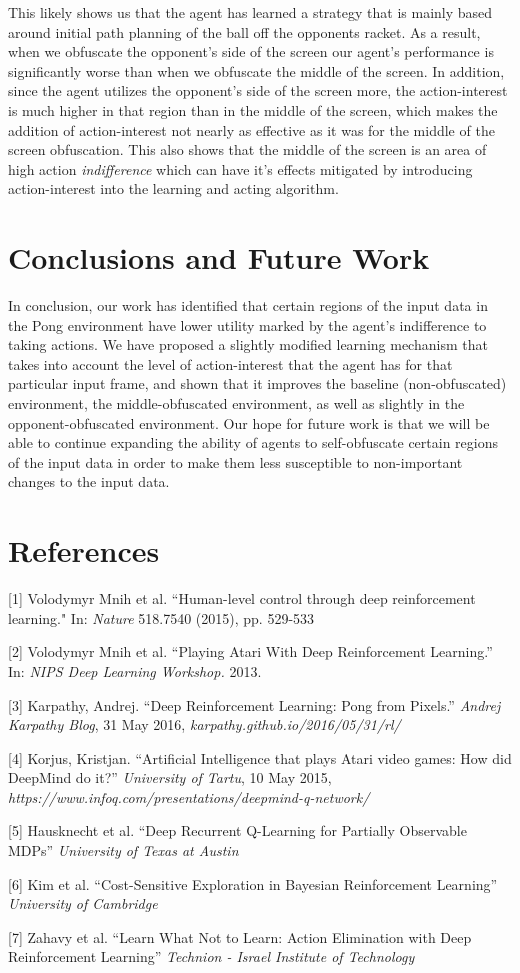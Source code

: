 \documentclass{article}
\begin{document}
This likely shows us that the agent has learned a strategy that is mainly based around initial path planning of the ball off the opponents racket.
As a result, when we obfuscate the opponent's side of the screen our agent's performance is significantly worse than when we obfuscate the middle of the
screen. In addition, since the agent utilizes the opponent's side of the screen more, the action-interest is much higher in that region than in the
middle of the screen, which makes the addition of action-interest not nearly as effective as it was for the middle of the screen obfuscation.
This also shows that the middle of the screen is an area of high action \textit{indifference} which can have it's effects mitigated by introducing
action-interest into the learning and acting algorithm. 


\section{Conclusions and Future Work}

In conclusion, our work has identified that certain regions of the input data in the Pong environment have lower utility marked by 
the agent's indifference to taking actions. We have proposed a slightly modified learning mechanism that takes into account the level of action-interest
that the agent has for that particular input frame, and shown that it improves the baseline (non-obfuscated) environment, the middle-obfuscated environment,
as well as slightly in the opponent-obfuscated environment. Our hope for future work is that we will be able to continue expanding the ability of agents to
self-obfuscate certain regions of the input data in order to make them less susceptible to non-important changes to the input data.

\section*{References}
\medskip
\small
[1] Volodymyr Mnih et al. ``Human-level control through deep reinforcement learning." In: {\it Nature}
518.7540 (2015), pp. 529-533 

[2] Volodymyr Mnih et al. ``Playing Atari With Deep Reinforcement Learning.'' In: {\it NIPS Deep Learning
Workshop.} 2013. 

[3] Karpathy, Andrej. ``Deep Reinforcement Learning: Pong from Pixels.'' {\it Andrej Karpathy Blog},
31 May 2016, {\it karpathy.github.io/2016/05/31/rl/}

[4] Korjus, Kristjan. ``Artificial Intelligence that plays Atari video games: How did DeepMind do it?'' {\it University of Tartu},
10 May 2015, {\it https://www.infoq.com/presentations/deepmind-q-network/}

[5] Hausknecht et al. ``Deep Recurrent Q-Learning for Partially Observable MDPs'' {\it University of Texas at Austin}

[6] Kim et al. ``Cost-Sensitive Exploration in Bayesian Reinforcement Learning'' {\it University of Cambridge}

[7] Zahavy et al. ``Learn What Not to Learn: Action Elimination with Deep Reinforcement Learning'' {\it Technion - Israel Institute of Technology}
\end{document}
